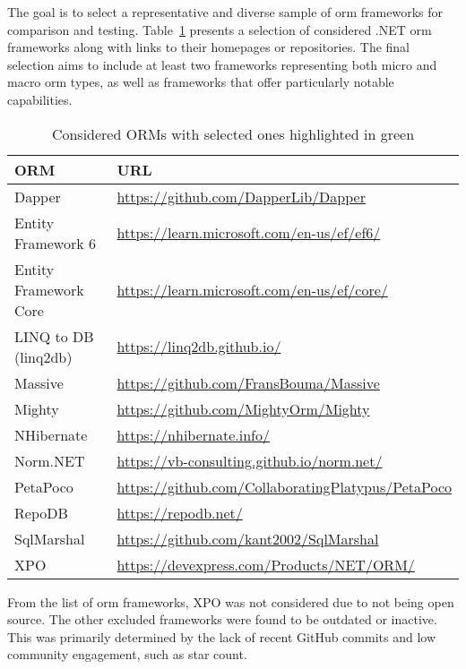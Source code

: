 The goal is to select a representative and diverse sample of \acrshort{orm} frameworks for comparison and testing. Table~\ref{tab:orm-docs} presents a selection of considered .NET \acrshort{orm} frameworks along with links to their homepages or repositories. The final selection aims to include at least two frameworks representing both micro and macro \acrshort{orm} types, as well as frameworks that offer particularly notable capabilities.

\begin{table}[ht!]
\footnotesize
\def\arraystretch{1.25}
\centering
\begin{tabular}{ll}
\toprule
\textbf{ORM} & \textbf{URL} \\
\midrule
\cellcolor{lightgreen}Dapper & \url{https://github.com/DapperLib/Dapper} \\
\cellcolor{lightgreen}Entity Framework 6 & \url{https://learn.microsoft.com/en-us/ef/ef6/} \\
\cellcolor{lightgreen}Entity Framework Core & \url{https://learn.microsoft.com/en-us/ef/core/} \\
\cellcolor{lightgreen}LINQ to DB (linq2db) & \url{https://linq2db.github.io/} \\
Massive & \url{https://github.com/FransBouma/Massive} \\
Mighty & \url{https://github.com/MightyOrm/Mighty} \\
\cellcolor{lightgreen}NHibernate & \url{https://nhibernate.info/} \\
Norm.NET & \url{https://vb-consulting.github.io/norm.net/} \\
\cellcolor{lightgreen}PetaPoco & \url{https://github.com/CollaboratingPlatypus/PetaPoco} \\
\cellcolor{lightgreen}RepoDB & \url{https://repodb.net/} \\
SqlMarshal & \url{https://github.com/kant2002/SqlMarshal} \\
XPO & \url{https://devexpress.com/Products/NET/ORM/} \\
\bottomrule
\end{tabular}
\caption{Considered ORMs with selected ones highlighted in green\label{tab:orm-docs}}
\end{table}

From the list of \acrshort{orm} frameworks, XPO was not considered due to not being open source. The other excluded frameworks were found to be outdated or inactive. This was primarily determined by the lack of recent GitHub commits and low community engagement, such as star count. 

